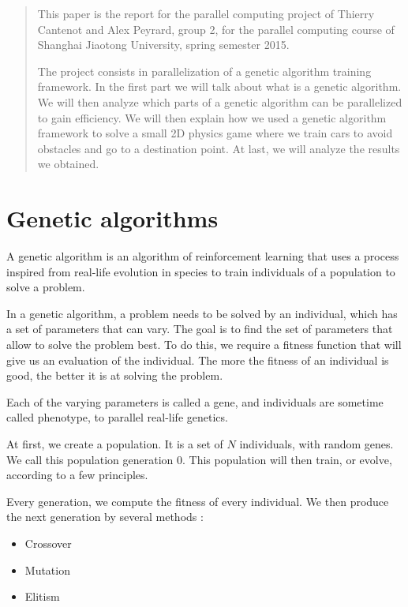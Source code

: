 \documentclass{acm_proc_article-sp}
\begin{document}
\maketitle

\begin{abstract}
This paper is the report for the parallel computing project of Thierry Cantenot and Alex Peyrard, group 2, for the parallel computing course of Shanghai Jiaotong University, spring semester 2015.

The project consists in parallelization of a genetic algorithm training framework. In the first part we will talk about what is a genetic algorithm. We will then analyze which parts of a genetic algorithm can be parallelized to gain efficiency. We will then explain how we used a genetic algorithm framework to solve a small 2D physics game where we train cars to avoid obstacles and go to a destination point. At last, we will analyze the results we obtained.
\end{abstract}


\section{Genetic algorithms}
A genetic algorithm is an algorithm of reinforcement learning that uses a process inspired from real-life evolution in species to train individuals of a population to solve a problem.

In a genetic algorithm, a problem needs to be solved by an individual, which has a set of parameters that can vary. The goal is to find the set of parameters that allow to solve the problem best. To do this, we require a fitness function that will give us an evaluation of the individual. The more the fitness of an individual is good, the better it is at solving the problem.

Each of the varying parameters is called a gene, and individuals are sometime called phenotype, to parallel real-life genetics.

At first, we create a population. It is a set of $N$ individuals, with random genes. We call this population generation 0. This population will then train, or evolve, according to a few principles.

Every generation, we compute the fitness of every individual.
We then produce the next generation by several methods :
\begin{itemize}
	\item Crossover
	\item Mutation
	\item Elitism
\end{itemize}
\end{document}
